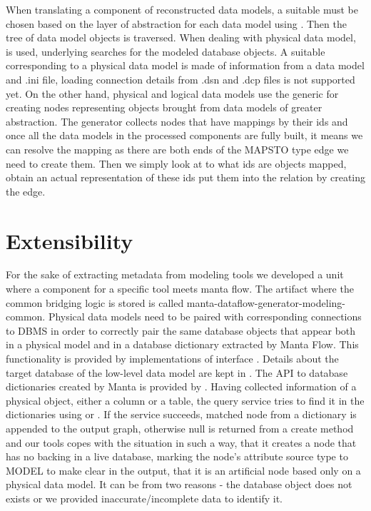 When translating a component of reconstructed data models, a suitable  must be chosen based on the layer of abstraction for each data model using .
Then the tree of data model objects is traversed. When dealing with physical data model,  is used, underlying  searches for the modeled database objects. A suitable  corresponding to a physical data model is made of information from a data model and .ini file, loading connection details from .dsn and .dcp files is not supported yet.
On the other hand, physical and logical data models use the generic  for creating nodes representing objects brought from data models of greater abstraction.
The generator collects nodes that have mappings by their ids and once all the data models in the processed components are fully built, it means we can resolve the mapping as there are both ends of the MAPS\textunderscore TO type edge we need to create them. Then we simply look at to what ids are objects mapped, obtain an actual representation of these ids put them into the relation by creating the edge.

\section{Extensibility}

For the sake of extracting metadata from modeling tools we developed a unit where a component for a specific tool meets manta flow.
The artifact where the common bridging logic is stored is called manta-dataflow-generator-modeling-common.
Physical data models need to be paired with corresponding connections to DBMS in order to correctly pair the same database objects that appear both in a physical model and in a database dictionary extracted by Manta Flow. This functionality is provided by implementations of interface . Details about the target database of the low-level data model are kept in . The API to database dictionaries created by Manta is provided by . 
Having collected information of a physical object, either a column or a table, the query service tries to find it in the dictionaries using  or . 
If the service succeeds, matched node from a dictionary is appended to the output graph, otherwise null is returned from a create method and our tools copes with the situation in such a way, that it creates a node that has no backing in a live database, marking the node's attribute source type to MODEL to make clear in the output, that it is an artificial node based only on a physical data model. It can be from two reasons - the database object does not exists or we provided inaccurate/incomplete data to identify it.

